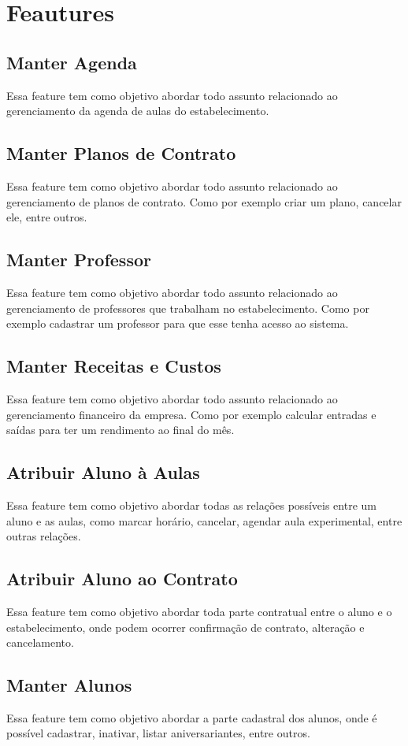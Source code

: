 \section[Features]{Feautures}
\subsection[Manter Agenda]{Manter Agenda}
Essa feature tem como objetivo abordar todo assunto relacionado ao gerenciamento
da agenda de aulas do estabelecimento.

\subsection[Manter Planos de Contrato]{Manter Planos de Contrato}
Essa feature tem como objetivo abordar todo assunto relacionado ao gerenciamento
de planos de contrato. Como por exemplo criar um plano, cancelar ele, entre
outros.

\subsection[Manter Professor]{Manter Professor}
Essa feature tem como objetivo abordar todo assunto relacionado ao gerenciamento
de professores que trabalham no estabelecimento. Como por exemplo cadastrar
um professor para que esse tenha acesso ao sistema.

\subsection[Manter Receitas e Custos]{Manter Receitas e Custos}
Essa feature tem como objetivo abordar todo assunto relacionado ao gerenciamento
financeiro da empresa. Como por exemplo calcular entradas e saídas para ter um
rendimento ao final do mês.

\subsection[Atribuir Aluno à Aulas]{Atribuir Aluno à Aulas}
Essa feature tem como objetivo abordar todas as relações possíveis entre
um aluno e as aulas,
como marcar horário, cancelar, agendar aula experimental, entre outras relações.

\subsection[Atribuir Aluno ao Contrato]{Atribuir Aluno ao Contrato}
Essa feature tem como objetivo abordar toda parte contratual entre o aluno e o
estabelecimento, onde podem ocorrer confirmação de contrato, alteração e
cancelamento.

\subsection[Manter Alunos]{Manter Alunos}
Essa feature tem como objetivo abordar a parte cadastral dos alunos, onde é possível
cadastrar, inativar, listar aniversariantes, entre outros.

